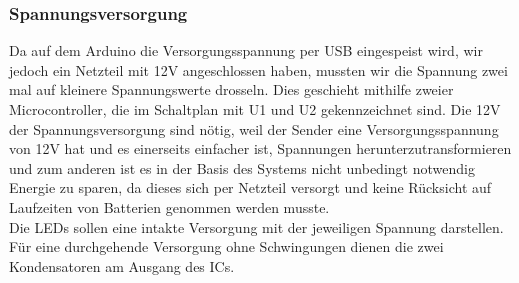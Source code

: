 \subsubsection{Spannungsversorgung}
Da auf dem Arduino die Versorgungsspannung per USB eingespeist wird, wir jedoch ein Netzteil mit 12V angeschlossen haben, mussten wir die Spannung zwei mal auf kleinere Spannungswerte drosseln. Dies geschieht mithilfe zweier Microcontroller, die im Schaltplan mit U1 und U2 gekennzeichnet sind. Die 12V der Spannungsversorgung sind nötig, weil der Sender eine Versorgungsspannung von 12V hat und es einerseits einfacher ist, Spannungen herunterzutransformieren und zum anderen ist es in der Basis des Systems nicht unbedingt notwendig Energie zu sparen, da dieses sich per Netzteil versorgt und keine Rücksicht auf Laufzeiten von Batterien genommen werden musste.\\
Die LEDs sollen eine intakte Versorgung mit der jeweiligen Spannung darstellen. Für eine durchgehende Versorgung ohne Schwingungen dienen die zwei Kondensatoren am Ausgang des ICs. 
